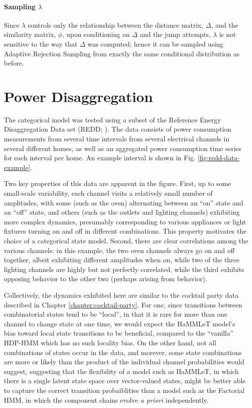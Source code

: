\paragraph{Sampling $\lambda$} Since $\lambda$ controls only the relationship between the distance matrix, $\Delta$, and the similarity matrix, $\phi$, upon 
conditioning on $\Delta$ and the jump attempts, $\lambda$ is not sensitive to the way that $\Delta$ was computed; hence it can be sampled using Adaptive Rejection Sampling from exactly the same conditional distribution as before.

\section{Power Disaggregation}
\label{sec:power-disaggregation}

The categorical model was tested using a subset of the Reference Energy Disaggregation Data set (REDD; \citet{kolter2011redd}).  The data consists of power consumption measurements from several time intervals from several electrical channels in several different homes, as well as an aggregated power consumption time series for each interval per home. An example interval is shown in Fig. \ref{fig:redd-data-example}.  

Two key properties of this data are apparent in the figure.  First, up to some small-scale variability, each channel visits a relatively small number of amplitudes, with some (such as the oven) alternating between an ``on'' state and an ``off'' state, and others (such as the outlets and lighting channels) exhibiting more complex dynamics, presumably corresponding to various appliances or light fixtures turning on and off in different combinations.  This property motivates the choice of a categorical state model.  Second, there are clear correlations among the various channels: in this example, the two oven channels always go on and off together, albeit exhibiting different amplitudes when on, while two of the three lighting channels are highly but not perfectly correlated, while the third exhibits opposing behavior to the other two (perhaps arising from behavior).

Collectively, the dynamics exhibited here are similar to the cocktail party data described in Chapter \ref{chapter:cocktail-party}.  For one, since transitions between combinatorial states tend to be ``local'', in that it is rare for more than one channel to change state at one time, we would expect the HaMMLeT model's bias toward local state transitions to be beneficial, compared to the ``vanilla'' HDP-HMM which has no such locality bias.  On the other hand, not all combinations of states occur in the data, and morever, some state combinations are more or likely than the product of the individual channel probabilities would suggest, suggesting that the flexibility of a model such as HaMMLeT, in which there is a single latent state space over vector-valued states, might be better able to capture the correct transition probaiblities than a model such as the Factorial HMM, in which the component chains evolve {\em a priori} independently.

